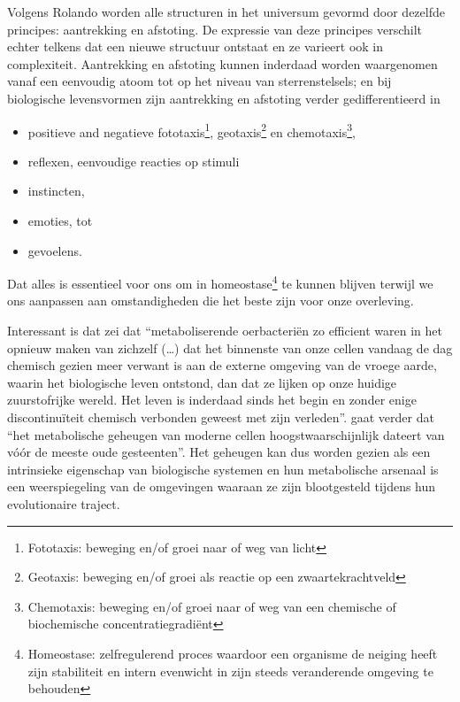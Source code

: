 \documentclass[
  11pt,
]{book}
\providecommand{\tightlist}{%
  \setlength{\itemsep}{0pt}\setlength{\parskip}{0pt}}
\begin{document}
Volgens Rolando worden alle structuren in het universum gevormd door dezelfde principes: aantrekking en afstoting. De expressie van deze principes verschilt echter telkens dat een nieuwe structuur ontstaat en ze varieert ook in complexiteit. Aantrekking en afstoting kunnen inderdaad worden waargenomen vanaf een eenvoudig atoom tot op het niveau van sterrenstelsels; en bij biologische levensvormen zijn aantrekking en afstoting verder gedifferentieerd in

\begin{itemize}
\tightlist
\item
  positieve and negatieve fototaxis\footnote{Fototaxis: beweging en/of groei naar of weg van licht}, geotaxis\footnote{Geotaxis: beweging en/of groei als reactie op een zwaartekrachtveld} en chemotaxis\footnote{Chemotaxis: beweging en/of groei naar of weg van een chemische of biochemische concentratiegradiënt},
\item
  reflexen, eenvoudige reacties op stimuli
\item
  instincten,
\item
  emoties, tot
\item
  gevoelens.
\end{itemize}

Dat alles is essentieel voor ons om in homeostase\footnote{Homeostase: zelfregulerend proces waardoor een organisme de neiging heeft zijn stabiliteit en intern evenwicht in zijn steeds veranderende omgeving te behouden} te kunnen blijven terwijl we ons aanpassen aan omstandigheden die het beste zijn voor onze overleving.

Interessant is dat \citet{margulis1999} zei dat ``metaboliserende oerbacteriën zo efficient waren in het opnieuw maken van zichzelf (\ldots) dat het binnenste van onze cellen vandaag de dag chemisch gezien meer verwant is aan de externe omgeving van de vroege aarde, waarin het biologische leven ontstond, dan dat ze lijken op onze huidige zuurstofrijke wereld. Het leven is inderdaad sinds het begin en zonder enige discontinuïteit chemisch verbonden geweest met zijn verleden''. \citet{margulis1999} gaat verder dat ``het metabolische geheugen van moderne cellen hoogstwaarschijnlijk dateert van vóór de meeste oude gesteenten''. Het geheugen kan dus worden gezien als een intrinsieke eigenschap van biologische systemen en hun metabolische arsenaal is een weerspiegeling van de omgevingen waaraan ze zijn blootgesteld tijdens hun evolutionaire traject.
\end{document}
